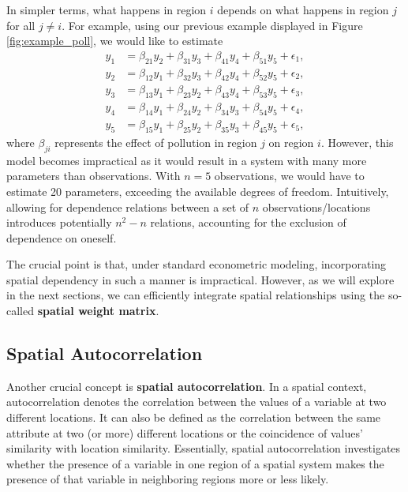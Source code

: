 \documentclass[english,12pt]{book}\usepackage[]{graphicx}\usepackage[]{xcolor}
\begin{document}
In simpler terms, what happens in region $i$ depends on what happens in region $j$ for all $j \neq i$. For example, using our previous example displayed in Figure \ref{fig:example_poll}, we would like to estimate 
\begin{equation*}
  \begin{aligned}
y_1 & = \beta_{21} y_2 + \beta_{31} y_3 + \beta_{41} y_4 + \beta_{51} y_5 + \epsilon_1, \\
y_2 & = \beta_{12} y_1 + \beta_{32} y_3 + \beta_{42} y_4 + \beta_{52} y_5 + \epsilon_2, \\
y_3 & = \beta_{13} y_1 + \beta_{23} y_2 + \beta_{43} y_4 + \beta_{53} y_5 + \epsilon_3, \\
y_4 & = \beta_{14} y_1 + \beta_{24} y_2 + \beta_{34} y_3 + \beta_{54} y_5 + \epsilon_4, \\
y_5 & = \beta_{15} y_1 + \beta_{25} y_2 + \beta_{35} y_3 + \beta_{45} y_5 + \epsilon_5, 
\end{aligned}
\end{equation*}
%
where $\beta_{ji}$ represents the effect of pollution in region $j$ on region $i$. However, this model becomes impractical as it would result in a system with many more parameters than observations. With $n = 5$ observations, we would have to estimate 20 parameters, exceeding the available degrees of freedom. Intuitively, allowing for dependence relations between a set of $n$ observations/locations introduces potentially $n^2 - n$ relations, accounting for the exclusion of dependence on oneself.

The crucial point is that, under standard econometric modeling, incorporating spatial dependency in such a manner is impractical. However, as we will explore in the next sections, we can efficiently integrate spatial relationships using the so-called \textbf{spatial weight matrix}. 

\subsection{Spatial Autocorrelation}\label{sec:Spatial_autocorrelation}

Another crucial concept is \textbf{spatial autocorrelation}. In a spatial context, autocorrelation denotes the correlation between the values of a variable at two different locations. It can also be defined as the correlation between the same attribute at two (or more) different locations or the coincidence of values' similarity with location similarity. Essentially, spatial autocorrelation investigates whether the presence of a variable in one region of a spatial system makes the presence of that variable in neighboring regions more or less likely.
\end{document}
